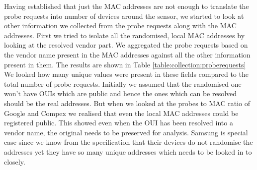 Having established that just the MAC addresses are not enough to translate the probe requests into number of devices around the sensor, we started to look at other information we collected from the probe requests along with the MAC addresses.
First we tried to isolate all the randomised, local MAC addresses by looking at the resolved vendor part.
We aggregated the probe requests based on the vendor name present in the MAC addresses against all the other information present in them.
The results are shown in Table \ref{table:collection:proberequests}
We looked how many unique values were present in these fields compared to the total number of probe requests. 
Initially we assumed that the randomised one won't have OUIs which are public and hence the ones which can be resolved should be the real addresses.
But when we looked at the probes to MAC ratio of Google and Compex we realised that even the local MAC addresses could be registered public. 
This showed even when the OUI has been resolved into a vendor name, the original needs to be preserved for analysis.
Samsung is special case since we know from the specification that their devices do not randomise the addresses yet they have so many unique addresses which needs to be looked in to closely.

